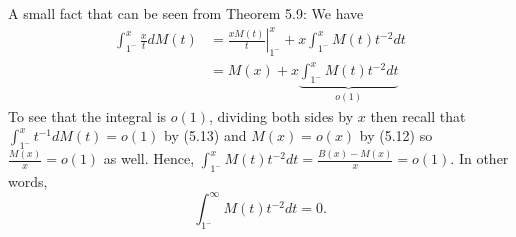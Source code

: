 \documentclass[12pt]{article}
\begin{document}
A small fact that can be seen from Theorem 5.9: We have
\begin{align*}
\int_{1^-}^x \frac{x}{t} dM(t) &= \left. \frac{x M(t)}{t} \right|_{1^-}^x + x \int_{1^-}^x M(t) t^{-2} dt\\
&= M(x) + x \underbrace{\int_{1^-}^x M(t) t^{-2} dt}_{o(1)}
\end{align*}
To see that the integral is $o(1)$, dividing both sides by $x$ then recall that $\int_{1^-}^x t^{-1} dM(t) = o(1)$ by (5.13) and $M(x) = o(x)$ by (5.12) so $\frac{M(x)}{x} = o(1)$ as well. Hence, $\int_{1^-}^x M(t) t^{-2} dt = \frac{B(x) - M(x)}{x} = o(1)$. In other words,
$$\int_{1^-}^\infty M(t) t^{-2} dt = 0.$$

\unless\ifdefined\IsMainDocument
\end{document}
